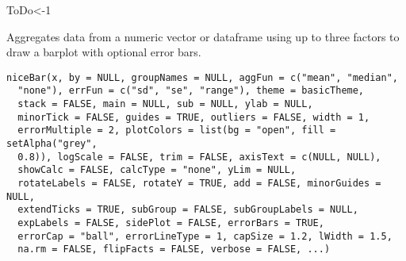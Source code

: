 \documentclass[a4paper]{book}
\begin{document}
%
\begin{Examples}
\begin{ExampleCode}
ToDo<-1

\end{ExampleCode}
\end{Examples}
%
\begin{Description}\relax
Aggregates data from a numeric vector or dataframe using up to three factors to draw a barplot with optional error bars.
\end{Description}
%
\begin{Usage}
\begin{verbatim}
niceBar(x, by = NULL, groupNames = NULL, aggFun = c("mean", "median",
  "none"), errFun = c("sd", "se", "range"), theme = basicTheme,
  stack = FALSE, main = NULL, sub = NULL, ylab = NULL,
  minorTick = FALSE, guides = TRUE, outliers = FALSE, width = 1,
  errorMultiple = 2, plotColors = list(bg = "open", fill = setAlpha("grey",
  0.8)), logScale = FALSE, trim = FALSE, axisText = c(NULL, NULL),
  showCalc = FALSE, calcType = "none", yLim = NULL,
  rotateLabels = FALSE, rotateY = TRUE, add = FALSE, minorGuides = NULL,
  extendTicks = TRUE, subGroup = FALSE, subGroupLabels = NULL,
  expLabels = FALSE, sidePlot = FALSE, errorBars = TRUE,
  errorCap = "ball", errorLineType = 1, capSize = 1.2, lWidth = 1.5,
  na.rm = FALSE, flipFacts = FALSE, verbose = FALSE, ...)
\end{verbatim}
\end{Usage}
%
\end{document}
